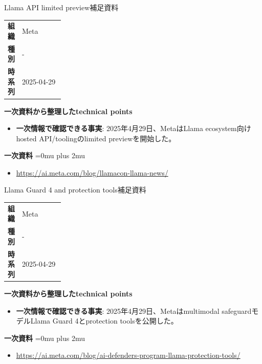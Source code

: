 \begin{technicalnote}{Llama API limited preview}{補足資料}
\begingroup
\begin{tabularx}{\linewidth}{@{}>{\bfseries}p{0.22\linewidth}X@{}}
組織 & Meta \\
種別 & - \\
時系列 & 2025-04-29 \\
\end{tabularx}
\smallskip
{\bfseries 一次資料から整理したtechnical points}
\begin{itemize}[leftmargin=1.5em,itemsep=0.35em]
\item \textbf{一次情報で確認できる事実}: 2025年4月29日、MetaはLlama ecosystem向けhosted API/toolingのlimited previewを開始した。
\end{itemize}
\begin{samepage}
{\bfseries 一次資料}
\begingroup\sloppy
\Urlmuskip=0mu plus 2mu\relax
\begin{itemize}[leftmargin=1.5em,itemsep=0.25em]
\item {\scriptsize\url{https://ai.meta.com/blog/llamacon-llama-news/}}
\end{itemize}
\endgroup
\end{samepage}
\endgroup
\end{technicalnote}
\medskip

\begin{technicalnote}{Llama Guard 4 and protection tools}{補足資料}
\begingroup
\begin{tabularx}{\linewidth}{@{}>{\bfseries}p{0.22\linewidth}X@{}}
組織 & Meta \\
種別 & - \\
時系列 & 2025-04-29 \\
\end{tabularx}
\smallskip
{\bfseries 一次資料から整理したtechnical points}
\begin{itemize}[leftmargin=1.5em,itemsep=0.35em]
\item \textbf{一次情報で確認できる事実}: 2025年4月29日、Metaはmultimodal safeguardモデルLlama Guard 4とprotection toolsを公開した。
\end{itemize}
\begin{samepage}
{\bfseries 一次資料}
\begingroup\sloppy
\Urlmuskip=0mu plus 2mu\relax
\begin{itemize}[leftmargin=1.5em,itemsep=0.25em]
\item {\scriptsize\url{https://ai.meta.com/blog/ai-defenders-program-llama-protection-tools/}}
\end{itemize}
\endgroup
\end{samepage}
\endgroup
\end{technicalnote}
\medskip

